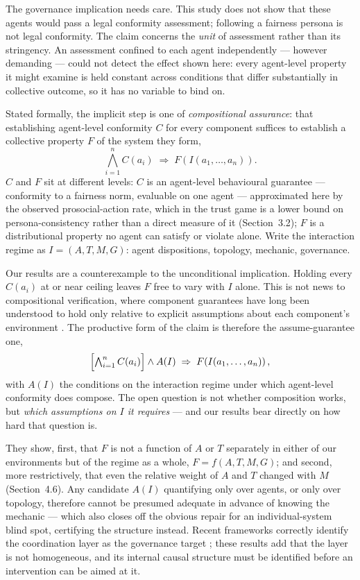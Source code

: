 \documentclass[11pt,a4paper]{article}
\begin{document}
The governance implication needs care. This study does not show that
these agents would pass a legal conformity assessment; following a
fairness persona is not legal conformity. The claim concerns the
\emph{unit} of assessment rather than its stringency. An assessment
confined to each agent independently --- however demanding --- could
not detect the effect shown here: every agent-level property it might
examine is held constant across conditions that differ substantially
in collective outcome, so it has no variable to bind on.

Stated formally, the implicit step is one of \emph{compositional
assurance}: that establishing agent-level conformity $C$ for every
component suffices to establish a collective property $F$ of the
system they form,
\[
\textstyle\bigwedge_{i=1}^{n} C(a_i) \;\Rightarrow\;
F\!\left(I(a_1,\dots,a_n)\right).
\]
$C$ and $F$ sit at different levels: $C$ is an agent-level behavioural
guarantee --- conformity to a fairness norm, evaluable on one agent
--- approximated here by the observed prosocial-action rate, which in
the trust game is a lower bound on persona-consistency rather than a
direct measure of it (Section~3.2); $F$ is a distributional property
no agent can satisfy or violate
alone. Write the interaction regime as $I = (A, T, M, G)$: agent
dispositions, topology, mechanic, governance.

Our results are a counterexample to the unconditional implication.
Holding every $C(a_i)$ at or near ceiling leaves $F$ free to vary with
$I$ alone. This is not news to compositional verification, where
component guarantees have long been understood to hold only relative
to explicit assumptions about each component's environment
\citep{Henzinger:1998:Assume}. The productive form of the claim is therefore
the assume-guarantee one,
\[
\Bigl[\textstyle\bigwedge_{i=1}^{n} C(a_i)\Bigr] \wedge A(I)
\;\Rightarrow\; F\!\left(I(a_1,\dots,a_n)\right),
\]
with $A(I)$ the conditions on the interaction regime under which
agent-level conformity does compose. The open question is not whether
composition works, but \emph{which assumptions on $I$ it requires} ---
and our results bear directly on how hard that question is.

They show, first, that $F$ is not a function of $A$ or $T$ separately
in either of our environments but of the regime as a whole,
$F = f(A,T,M,G)$; and second, more restrictively, that even the
relative weight of $A$ and $T$ changed with $M$
(Section~4.6). Any candidate $A(I)$ quantifying only over agents, or
only over topology, therefore cannot be presumed adequate in advance
of knowing the mechanic --- which also closes off the obvious repair
for an individual-system blind spot, certifying the structure instead.
Recent frameworks correctly identify the coordination layer as the
governance target \citep{Bohr:2026:Coordination,Pierucci:2026:Institutional}; these results add
that the layer is not homogeneous, and its internal causal structure
must be identified before an intervention can be aimed at it.
\end{document}
